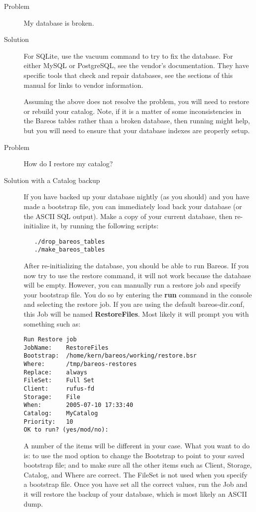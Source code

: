 \begin{description}
\item[Problem]
   My database is broken.
\item[Solution]
   For SQLite, use the vacuum command to try to fix the database. For either
   MySQL or PostgreSQL, see the vendor's documentation. They have specific tools
   that check and repair databases, see the  sections of this manual for links to vendor
   information.

   Assuming the above does not resolve the problem, you will need to restore
   or rebuild your catalog.  Note, if it is a matter of some
   inconsistencies in the Bareos tables rather than a broken database, then
   running  might help, but you will need to ensure
   that your database indexes are properly setup.

\item[Problem]
   How do I restore my catalog?
\item[Solution with a Catalog backup]
   If you have backed up your database nightly (as you should) and you
   have made a bootstrap file, you can immediately load back your
   database (or the ASCII SQL output).  Make a copy of your current
   database, then re-initialize it, by running the following scripts:
\begin{verbatim}
   ./drop_bareos_tables
   ./make_bareos_tables
\end{verbatim}
   After re-initializing the database, you should be able to run
   Bareos. If you now try to use the restore command, it will not
   work because the database will be empty. However, you can manually
   run a restore job and specify your bootstrap file. You do so
   by entering the {\bf run} command in the console and selecting the
   restore job.  If you are using the default bareos-dir.conf, this
   Job will be named {\bf RestoreFiles}. Most likely it will prompt
   you with something such as:

\footnotesize
\begin{verbatim}
Run Restore job
JobName:    RestoreFiles
Bootstrap:  /home/kern/bareos/working/restore.bsr
Where:      /tmp/bareos-restores
Replace:    always
FileSet:    Full Set
Client:     rufus-fd
Storage:    File
When:       2005-07-10 17:33:40
Catalog:    MyCatalog
Priority:   10
OK to run? (yes/mod/no):
\end{verbatim}
\normalsize

   A number of the items will be different in your case.  What you want to
   do is: to use the mod option to change the Bootstrap to point to your
   saved bootstrap file; and to make sure all the other items such as
   Client, Storage, Catalog, and Where are correct.  The FileSet is not
   used when you specify a bootstrap file.  Once you have set all the
   correct values, run the Job and it will restore the backup of your
   database, which is most likely an ASCII dump.


\end{description}
